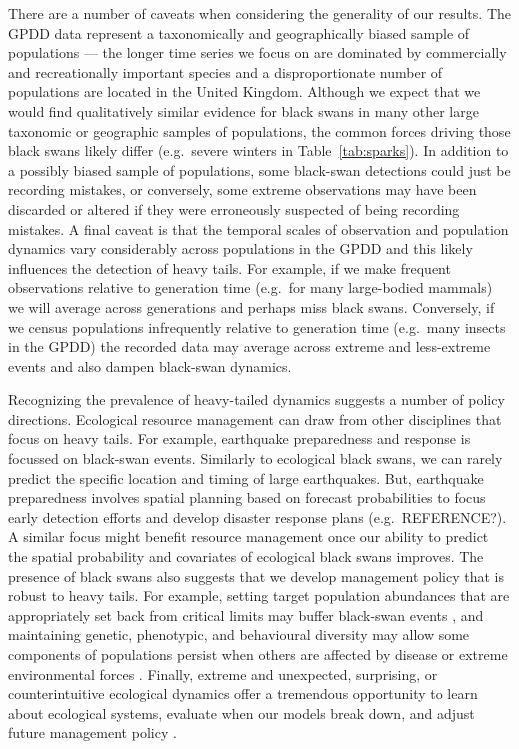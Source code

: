 There are a number of caveats when considering the generality of our results. The GPDD data represent a taxonomically and geographically biased sample of populations --- the longer time series we focus on are dominated by commercially and recreationally important species and a disproportionate number of populations are located in the United Kingdom. Although we expect that we would find qualitatively similar evidence for black swans in many other large taxonomic or geographic samples of populations, the common forces driving those black swans likely differ (e.g.~severe winters in Table~\ref{tab:sparks}). In addition to a possibly biased sample of populations, some black-swan detections could just be recording mistakes, or conversely, some extreme observations may have been discarded or altered if they were erroneously suspected of being recording mistakes. A final caveat is that the temporal scales of observation and population dynamics vary considerably across populations in the GPDD and this likely influences the detection of heavy tails. For example, if we make frequent observations relative to generation time (e.g.~for many large-bodied mammals) we will average across generations and perhaps miss black swans. Conversely, if we census populations infrequently relative to generation time (e.g.~many insects in the GPDD) the recorded data may average across extreme and less-extreme events and also dampen black-swan dynamics.

Recognizing the prevalence of heavy-tailed dynamics suggests a number of policy directions. Ecological resource management can draw from other disciplines that focus on heavy tails. For example, earthquake preparedness and response is focussed on black-swan events. Similarly to ecological black swans, we can rarely predict the specific location and timing of large earthquakes. But, earthquake preparedness involves spatial planning based on forecast probabilities to focus early detection efforts and develop disaster response plans (e.g.~REFERENCE?). A similar focus might benefit resource management once our ability to predict the spatial probability and covariates of ecological black swans improves. The presence of black swans also suggests that we develop management policy that is robust to heavy tails. For example, setting target population abundances that are appropriately set back from critical limits may buffer black-swan events \citep[e.g.][]{caddy1996}, and maintaining genetic, phenotypic, and behavioural diversity may allow some components of populations persist when others are affected by disease or extreme environmental forces \citep[e.g.][]{hilborn2003, schindler2010, anderson2014}. Finally, extreme and unexpected, surprising, or counterintuitive ecological dynamics offer a tremendous opportunity to learn about ecological systems, evaluate when our models break down, and adjust future management policy \citep{doak2008, pine-iii2009, lindenmayer2010}.

